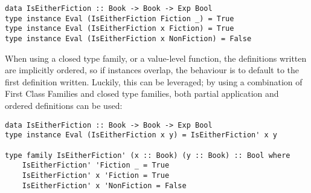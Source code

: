 \documentclass[12pt, a4paper, bibliography=totocnumbered]{scrreprt}
\newcommand{\inline}[1]{\lstinline[basicstyle=\ttfamily\footnotesize]{#1}}
\begin{document}
\begin{lstlisting}
data IsEitherFiction :: Book -> Book -> Exp Bool
type instance Eval (IsEitherFiction Fiction _) = True
type instance Eval (IsEitherFiction x Fiction) = True
type instance Eval (IsEitherFiction x NonFiction) = False
\end{lstlisting}

When using a closed type family, or a value-level function, the definitions written are implicitly ordered, so if instances overlap, the behaviour is to default to the first definition written. Luckily, this can be leveraged; by using a combination of First Class Families and closed type families, both partial application and ordered definitions can be used:

\begin{lstlisting}
data IsEitherFiction :: Book -> Book -> Exp Bool
type instance Eval (IsEitherFiction x y) = IsEitherFiction' x y

type family IsEitherFiction' (x :: Book) (y :: Book) :: Bool where
    IsEitherFiction' 'Fiction _ = True
    IsEitherFiction' x 'Fiction = True
    IsEitherFiction' x 'NonFiction = False
\end{lstlisting}






\end{document}
